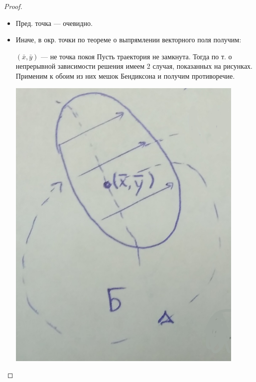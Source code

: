 	\begin{proof}
		\begin{itemize}
			\item Пред. точка --- очевидно. 
			\item Иначе, в окр. точки по теореме о выпрямлении векторного поля получим:
		
			\begin{minipage}{0.4\textwidth}
				\cntrKul $(\bar{x}, \bar{y})$ --- не точка покоя \cntrKul \newline
				Пусть траектория не замкнута. \newline 
				Тогда по т. о непрерывной зависимости решения имеем 2 случая,
				 	показанных на рисунках. Применим к обоим из них мешок Бендиксона и получим противоречие.
			\end{minipage}
				\hfill
			\begin{minipage}{0.24\textwidth}  \vspace{3mm}
			
				\begin{center} \includegraphics[width=0.9\textwidth]{ch8/pict/pict_9_1.png}\end{center} 
			\end{minipage}
			\begin{minipage}{0.24\textwidth} \vspace{4mm}
			

\end{minipage}
\end{itemize}
\end{proof}
